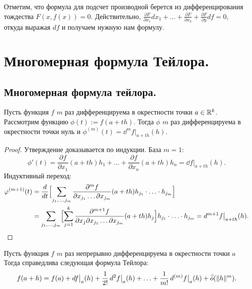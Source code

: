 \documentclass[a4paper]{article}
\theoremstyle{named}
\begin{document}
    \begin{remark*}
        Отметим, что формула для подсчет производной берется из дифференцирования тождества
        $F(x,f(x))=0$. Действительно, $\frac{\partial F}{\partial x_1}dx_1 + \ldots + \frac{\partial F}{\partial x_k}+\frac{\partial F}{\partial y}df=0$, откуда выражая $df$ и получаем нужную нам формулу.
    \end{remark*}

    \section{Многомерная формула Тейлора.} 

    \subsection{Многомерная формула тейлора.}
    
    \begin{lemma*}
        Пусть функция $f$ $m$ раз дифференцируема в окрестности точки $a\in \mathbb{R}^k$.
        Рассмотрим функцию $\phi(t):=f(a+th)$. Тогда $\phi$
        $m$ раз дифференцируема в окрестности точки нуль и
        $\phi^{(m)}(t)=\dd^mf\bigl|_{a+th}(h)$.
    \end{lemma*}
    
    \begin{proof}
        Утверждение доказывается по индукции.
        База $m=1$:
        $$
            \phi'(t)=\dfrac{\partial f}{\partial x_1}(a+th)h_1+\ldots+\dfrac{\partial f}{\partial x_n}(a+th)h_n = \dd f\bigl|_{a+th}(h).
        $$
        Индуктивный переход:
        \begin{align*}
            \varphi^{(m+1)}(t)
            & = \dfrac{d}{dt}\Bigl[\sum_{j_1,\ldots, j_m} \dfrac{\partial^mf}{\partial x_{j_1}\ldots\partial x_{j_m}}(a+th)h_{j_1}\cdot\ldots\cdot h_{j_m}\Bigr] \\
            & = \sum_{j_1,\ldots, j_m} \Bigl[\sum_{j=1}^{k}\dfrac{\partial^{m+1}f}{\partial x_j\partial x_{j_1}\ldots\partial x_{j_m}}(a+th)h_j\Bigr] h_{j_1}\cdot\ldots\cdot h_{j_m}
            =\mathop{}\!d^{m+1}f\bigl|_{a+th}(h).
        \end{align*}
    \end{proof}
    
    \begin{theorem*}
        Пусть функция $f$ $m$ раз непрерывно дифференцируема в окрестности точки $a$
        Тогда справедлива следующая формула Тейлора:
        $$
            f(a+h)=f(a)+\mathop{}\!d f\bigl|_a(h)+\dfrac{1}{2!}\mathop{}\!d^2f\bigl|_a(h)+\ldots+\dfrac{1}{m!}\mathop{}\!d^{(m)}f\bigl|_a(h) + \bar{\bar{o}}(\|h\|^m).
        $$
    \end{theorem*}
    
\end{document}
